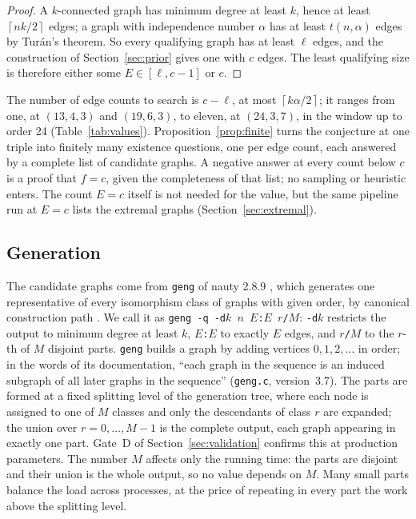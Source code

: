 \documentclass[11pt]{article}
\theoremstyle{definition}
\theoremstyle{remark}
\newcommand{\ceil}[1]{\left\lceil #1\right\rceil}
\begin{document}
\begin{proof}
A $k$-connected graph has minimum degree at least $k$, hence at least $\ceil{nk/2}$ edges; a graph with independence
number $\alpha$ has at least $t(n,\alpha)$ edges by Tur\'an's theorem. So every qualifying graph has at least $\ell$
edges, and the construction of Section~\ref{sec:prior} gives one with $c$ edges. The least qualifying size is
therefore either some $E\in[\ell,c-1]$ or $c$.
\end{proof}

The number of edge counts to search is $c-\ell$, at most $\ceil{k\alpha/2}$; it ranges from one, at $(13,4,3)$
and $(19,6,3)$, to eleven, at $(24,3,7)$, in the window up to order 24 (Table~\ref{tab:values}).
Proposition~\ref{prop:finite} turns the conjecture at one triple into finitely many existence questions, one per edge
count, each answered by a complete list of candidate graphs. A negative answer at every count below $c$ is a proof
that $f=c$, given the completeness of that list; no sampling or heuristic enters. The count $E=c$ itself is not needed
for the value, but the same pipeline run at $E=c$ lists the extremal graphs (Section~\ref{sec:extremal}).

\subsection{Generation}

The candidate graphs come from \texttt{geng} of nauty 2.8.9 \cite{nauty}, which generates one representative of every
isomorphism class of graphs with given order, by canonical construction path \cite{McKay98}. We call it as
\texttt{geng -q -d$k$ $n$ $E$:$E$ $r$/$M$}: \texttt{-d$k$} restricts the output to minimum degree at least $k$,
\texttt{$E$:$E$} to exactly $E$ edges, and \texttt{$r$/$M$} to the $r$-th of $M$ disjoint parts. \texttt{geng}
builds a graph by adding vertices $0,1,2,\dots$ in order; in the words of its documentation, ``each graph in the
sequence is an induced subgraph of all later graphs in the sequence'' (\texttt{geng.c}, version~3.7). The parts are
formed at a fixed splitting level of the generation tree, where each node is assigned to one of $M$ classes and only
the descendants of class $r$ are expanded; the union over $r=0,\dots,M-1$ is the complete output, each graph appearing
in exactly one part. Gate~D of Section~\ref{sec:validation} confirms this at production parameters. The number $M$ affects only the
running time: the parts are disjoint and their union is the whole output, so no value depends on $M$. Many small parts
balance the load across processes, at the price of repeating in every part the work above the splitting level.
\end{document}

